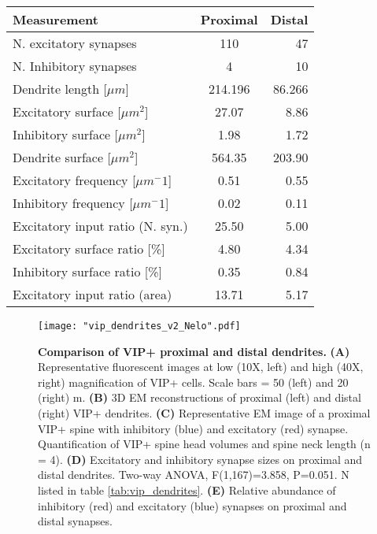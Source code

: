 \label{tab:vip_dendrites}
\begin{center}
	\begin{tabular}[c]{|l|c|r|}
		\hline
		Measurement & Proximal & Distal\\
		\hline
		N. excitatory synapses & 110 & 47\\
		\hline
		N. Inhibitory synapses & 4 & 10\\
		\hline
		Dendrite length [$\mu m$] & 214.196 & 86.266\\
		\hline
		Excitatory surface [$\mu m^2$] & 27.07 & 8.86\\
		\hline
		Inhibitory surface [$\mu m^2$] & 1.98 &  1.72\\
		\hline
		Dendrite surface [$\mu m^2$] & 564.35 & 203.90\\
		\hline
		Excitatory frequency [$\mu m ^-1$] & 0.51 & 0.55\\
		\hline
		Inhibitory frequency [$\mu m ^-1$] & 0.02 & 0.11\\
		\hline
		Excitatory input ratio (N. syn.) & 25.50 & 5.00\\
		\hline
		Excitatory surface ratio [\%] & 4.80 & 4.34\\
		\hline
		Inhibitory surface ratio [\%] & 0.35 & 0.84\\
		\hline	
		Excitatory input ratio (area) & 13.71 & 5.17\\
		\hline
	\end{tabular}
\end{center}

\begin{figure}
	\captionsetup[figure]{indentation=0pt}
	\texttt{[image: "vip\_dendrites\_v2\_Nelo".pdf]}
	\caption[Comparison of VIP+ proximal and distal dendrites.]{\textbf{Comparison of VIP+ proximal and distal dendrites.} \textbf{(A)} Representative fluorescent images at low (10X, left) and high (40X, right) magnification of VIP+ cells. Scale bars =  50 (left) and 20 (right) \textmu m. \textbf{(B)} 3D EM reconstructions of proximal (left) and distal (right) VIP+ dendrites. \textbf{(C)} Representative EM image of a proximal VIP+ spine with inhibitory (blue) and excitatory (red) synapse. Quantification of VIP+ spine head volumes and spine neck length (n = 4). \textbf{(D)} Excitatory and inhibitory synapse sizes on proximal and distal dendrites. Two-way ANOVA, F(1,167)=3.858, P=0.051. N listed in table \ref{tab:vip_dendrites}. \textbf{(E)} Relative abundance of inhibitory (red) and excitatory (blue) synapses on proximal and distal synapses.}	
	\label{fig:vip_dendrites}
\end{figure}
